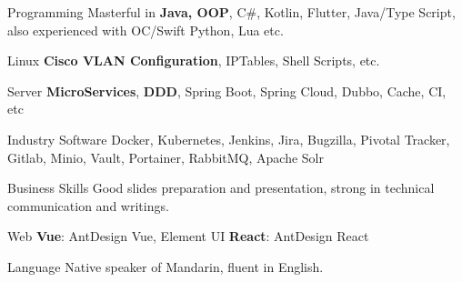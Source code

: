 

\begin{cvskills}

  \cvskill
    {Programming} %
    {Masterful in \textbf{Java, OOP}, {C\#}, {Kotlin}, {Flutter}, {Java/Type Script}, also experienced with {OC/Swift} {Python}, Lua etc.} %


  \cvskill
    {Linux} %
    {\textbf{Cisco VLAN Configuration}, {IPTables}, {Shell Scripts},   etc. } %


  \cvskill
    {Server} %
    {\textbf{MicroServices}, \textbf{DDD}, Spring Boot, Spring Cloud, Dubbo, Cache,  CI, etc } %

  \cvskill
    {Industry Software} %
    { Docker, Kubernetes, Jenkins, Jira, Bugzilla, {Pivotal Tracker}, Gitlab, Minio, Vault, Portainer, RabbitMQ, Apache Solr}%

    
  \cvskill
    {Business Skills} %
    {Good slides preparation and presentation, strong in technical communication and writings.} %

  \cvskill
    {Web} %
    {\textbf{Vue}: AntDesign Vue, Element UI \textbf{React}: AntDesign React } %

  \cvskill
    {Language} %
    {Native speaker of Mandarin, fluent in English.} %
\end{cvskills}
